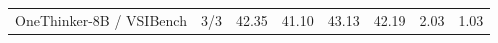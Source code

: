 \begin{table}[t]
{\begin{tabular}{lrrrrrrr}
OneThinker-8B / VSIBench & 3/3 & 42.35 & 41.10 & 43.13 & 42.19 & 2.03 & 1.03 \\

\end{tabular}}
\end{table}
